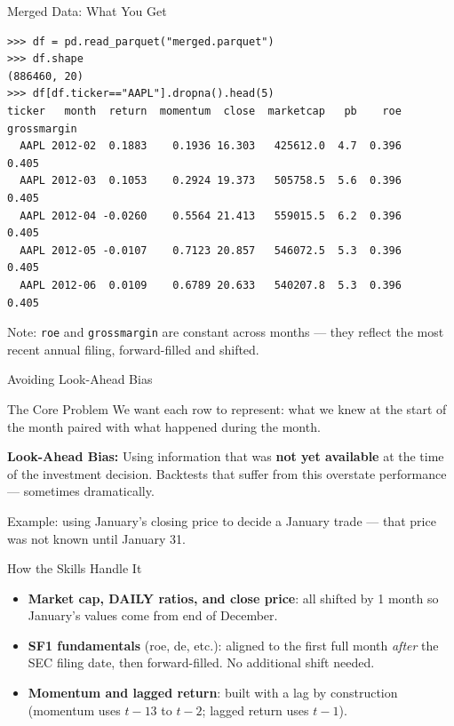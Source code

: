 \documentclass[aspectratio=169,t]{beamer}
\begin{document}
\begin{frame}[fragile]{Merged Data: What You Get}
\small
\begin{verbatim}
>>> df = pd.read_parquet("merged.parquet")
>>> df.shape
(886460, 20)
>>> df[df.ticker=="AAPL"].dropna().head(5)
ticker   month  return  momentum  close  marketcap   pb    roe  grossmargin
  AAPL 2012-02  0.1883    0.1936 16.303   425612.0  4.7  0.396      0.405
  AAPL 2012-03  0.1053    0.2924 19.373   505758.5  5.6  0.396      0.405
  AAPL 2012-04 -0.0260    0.5564 21.413   559015.5  6.2  0.396      0.405
  AAPL 2012-05 -0.0107    0.7123 20.857   546072.5  5.3  0.396      0.405
  AAPL 2012-06  0.0109    0.6789 20.633   540207.8  5.3  0.396      0.405
\end{verbatim}
\vspace{0.2cm}
Note: \texttt{roe} and \texttt{grossmargin} are constant across months --- they reflect the most recent annual filing, forward-filled and shifted.
\end{frame}


\begin{frame}[c]
\centering
\Huge Avoiding Look-Ahead Bias
\end{frame}

\begin{frame}{The Core Problem}
We want each row to represent: \alert{what we knew at the start of the month} paired with \alert{what happened during the month}.
\vspace{0.3cm}

\textbf{Look-Ahead Bias:} Using information that was \textbf{not yet available} at the time of the investment decision. Backtests that suffer from this overstate performance --- sometimes dramatically.

\vspace{0.3cm}
Example: using January's closing price to decide a January trade --- that price was not known until January 31.
\end{frame}

\begin{frame}{How the Skills Handle It}
\begin{itemize}
\item \textbf{Market cap, DAILY ratios, and close price}: all shifted by 1 month so January's values come from end of December.
\item \textbf{SF1 fundamentals} (roe, de, etc.): aligned to the first full month \emph{after} the SEC filing date, then forward-filled.  No additional shift needed.
\item \textbf{Momentum and lagged return}: built with a lag by construction (momentum uses $t{-}13$ to $t{-}2$; lagged return uses $t{-}1$).
\end{itemize}
\end{frame}
\end{document}

